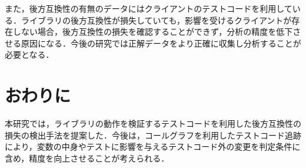 \documentclass[twocolumn]{jarticle} %
\begin{document}
また，後方互換性の有無のデータにはクライアントのテストコードを利用している．ライブラリの後方互換性が損失していても，影響を受けるクライアントが存在しない場合，後方互換性の損失を確認することができず，分析の精度を低下させる原因になる．今後の研究では正解データをより正確に収集し分析することが必要となる．

\section{おわりに}

本研究では，ライブラリの動作を検証するテストコードを利用した後方互換性の損失の検出手法を提案した．今後は，コールグラフを利用したテストコード追跡により，変数の中身やテストに影響を与えるテストコード外の変更を判定条件に含め，精度を向上させることが考えられる．







\end{document}
